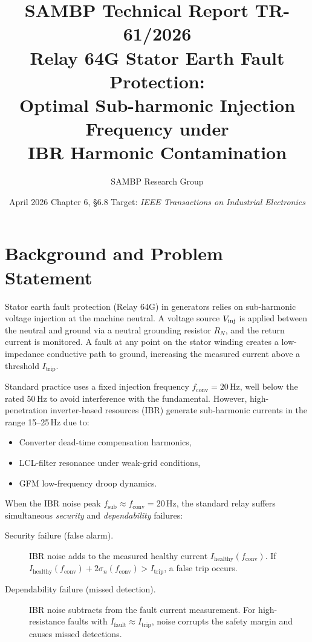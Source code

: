 \documentclass[11pt,a4paper]{article}
\title{%
  \textbf{\textsf{\color{sambpblue}SAMBP Technical Report TR-61/2026}}\\[6pt]
  \Large Relay 64G Stator Earth Fault Protection:\\
  Optimal Sub-harmonic Injection Frequency under\\
  IBR Harmonic Contamination%
}
\author{SAMBP Research Group}
\date{April 2026 \quad\textbar\quad Chapter 6, \S6.8 \quad\textbar\quad
      Target: \emph{IEEE Transactions on Industrial Electronics}}
\newcommand{\Ihealthy}{I_{\mathrm{healthy}}}
\newcommand{\Ifault}{I_{\mathrm{fault}}}
\newcommand{\Itrip}{I_{\mathrm{trip}}}
\newcommand{\sigman}{\sigma_n}
\newcommand{\fsub}{f_{\mathrm{sub}}}
\newcommand{\fconv}{f_{\mathrm{conv}}}
\newcommand{\RN}{R_N}
\begin{document}
\maketitle
\thispagestyle{empty}
\tableofcontents
\clearpage

\section{Background and Problem Statement}
\label{sec:background}

Stator earth fault protection (Relay 64G) in generators relies on sub-harmonic
voltage injection at the machine neutral.  A voltage source $V_{\rm inj}$ is
applied between the neutral and ground via a neutral grounding resistor $\RN$,
and the return current is monitored.  A fault at any point on the stator
winding creates a low-impedance conductive path to ground, increasing the
measured current above a threshold $\Itrip$.

Standard practice uses a fixed injection frequency $\fconv = 20$\,Hz, well
below the rated 50\,Hz to avoid interference with the fundamental.  However,
high-penetration inverter-based resources (IBR) generate sub-harmonic
currents in the range 15--25\,Hz due to:
\begin{itemize}
  \item Converter dead-time compensation harmonics,
  \item LCL-filter resonance under weak-grid conditions,
  \item GFM low-frequency droop dynamics.
\end{itemize}
When the IBR noise peak $\fsub \approx \fconv = 20$\,Hz, the standard relay
suffers simultaneous \emph{security} and \emph{dependability} failures:

\begin{description}
  \item[Security failure (false alarm).]
    IBR noise adds to the measured healthy current $\Ihealthy(\fconv)$.
    If $\Ihealthy(\fconv) + 2\sigman(\fconv) > \Itrip$, a false trip occurs.
  \item[Dependability failure (missed detection).]
    IBR noise subtracts from the fault current measurement.  For high-resistance
    faults with $\Ifault \approx \Itrip$, noise corrupts the safety margin and
    causes missed detections.
\end{description}
\end{document}
